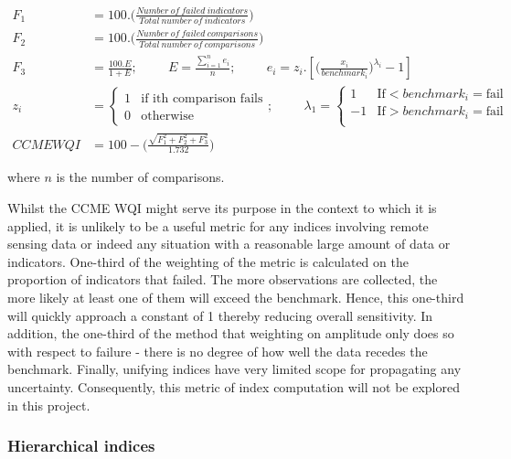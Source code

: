 $$
\begin{flalign*} F_1 &=
100.\bigg(\frac{Number~of~failed~indicators}{Total~number~of~indicators}\bigg)\\ F_2 &=
100.\bigg(\frac{Number~of~failed~comparisons}{Total~number~of~comparisons}\bigg)\\ F_3 &=
\frac{100.E}{1+E};\hspace{1cm} E=\frac{\sum^n_{i=1} e_i}{n};\hspace{1cm} e_i
=z_i.\left[\bigg(\frac{x_i}{benchmark_i}\bigg)^{\lambda_i} - 1\right]\\ z_i &= \begin{cases} 1 &
\text{if ith comparison fails}\\ 0 & \text{otherwise}
\end{cases}; \hspace{1cm} \lambda_1 = \begin{cases} 1 & \text{If} < benchmark_i = \text{fail}\\ -1 &
\text{If} > benchmark_i = \text{fail}\\
\end{cases}\\ CCME WQI &=100-\Bigg(\frac{\sqrt{F_1^2 + F_2^2 + F_3^2}}{1.732}\Bigg)
\end{flalign*}
$$

where $n$ is the number of comparisons.

Whilst the CCME WQI might serve its purpose in the context to which it is applied, it is unlikely to
be a useful metric for any indices involving remote sensing data or indeed any situation with a
reasonable large amount of data or indicators. One-third of the weighting of the metric is
calculated on the proportion of indicators that failed.  The more observations are collected, the
more likely at least one of them will exceed the benchmark.  Hence, this one-third will quickly
approach a constant of 1 thereby reducing overall sensitivity.  In addition, the one-third of the
method that weighting on amplitude only does so with respect to failure - there is no degree of how
well the data recedes the benchmark.  Finally, unifying indices have very limited scope for
propagating any uncertainty.  Consequently, this metric of index computation will not be explored in
this project.

\subsubsection{Hierarchical indices}\label{sec:hierarchicalIndices}

